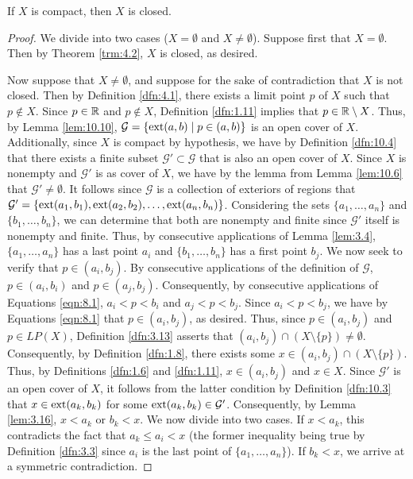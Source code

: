 \documentclass[../main.tex]{subfiles}
\begin{document}
\begin{theorem}\label{trm:10.11}
    If $X$ is compact, then $X$ is closed.
    \begin{proof}
        We divide into two cases ($X=\emptyset$ and $X\neq\emptyset$). Suppose first that $X=\emptyset$. Then by Theorem \ref{trm:4.2}, $X$ is closed, as desired.\par
        Now suppose that $X\neq\emptyset$, and suppose for the sake of contradiction that $X$ is not closed. Then by Definition \ref{dfn:4.1}, there exists a limit point $p$ of $X$ such that $p\notin X$. Since $p\in\mathbb{R}$ and $p\notin X$, Definition \ref{dfn:1.11} implies that $p\in\mathbb{R}\setminus X$. Thus, by Lemma \ref{lem:10.10}, $\mathcal{G}=\{\operatorname{ext}(a,b)\mid p\in(a,b)\}$ is an open cover of $X$. Additionally, since $X$ is compact by hypothesis, we have by Definition \ref{dfn:10.4} that there exists a finite subset $\mathcal{G}'\subset\mathcal{G}$ that is also an open cover of $X$. Since $X$ is nonempty and $\mathcal{G}'$ is as cover of $X$, we have by the lemma from Lemma \ref{lem:10.6} that $\mathcal{G}'\neq\emptyset$. It follows since $\mathcal{G}$ is a collection of exteriors of regions that $\mathcal{G}'=\{\operatorname{ext}(a_1,b_1),\operatorname{ext}(a_2,b_2),\dots,\operatorname{ext}(a_n,b_n)\}$. Considering the sets $\{a_1,\dots,a_n\}$ and $\{b_1,\dots,b_n\}$, we can determine that both are nonempty and finite since $\mathcal{G}'$ itself is nonempty and finite. Thus, by consecutive applications of Lemma \ref{lem:3.4}, $\{a_1,\dots,a_n\}$ has a last point $a_i$ and $\{b_1,\dots,b_n\}$ has a first point $b_j$. We now seek to verify that $p\in(a_i,b_j)$. By consecutive applications of the definition of $\mathcal{G}$, $p\in(a_i,b_i)$ and $p\in(a_j,b_j)$. Consequently, by consecutive applications of Equations \ref{eqn:8.1}, $a_i<p<b_i$ and $a_j<p<b_j$. Since $a_i<p<b_j$, we have by Equations \ref{eqn:8.1} that $p\in(a_i,b_j)$, as desired. Thus, since $p\in(a_i,b_j)$ and $p\in LP(X)$, Definition \ref{dfn:3.13} asserts that $(a_i,b_j)\cap(X\setminus\{p\})\neq\emptyset$. Consequently, by Definition \ref{dfn:1.8}, there exists some $x\in(a_i,b_j)\cap(X\setminus\{p\})$. Thus, by Definitions \ref{dfn:1.6} and \ref{dfn:1.11}, $x\in(a_i,b_j)$ and $x\in X$. Since $\mathcal{G}'$ is an open cover of $X$, it follows from the latter condition by Definition \ref{dfn:10.3} that $x\in\operatorname{ext}(a_k,b_k)$ for some $\operatorname{ext}(a_k,b_k)\in\mathcal{G}'$. Consequently, by Lemma \ref{lem:3.16}, $x<a_k$ or $b_k<x$. We now divide into two cases. If $x<a_k$, this contradicts the fact that $a_k\leq a_i<x$ (the former inequality being true by Definition \ref{dfn:3.3} since $a_i$ is the last point of $\{a_1,\dots,a_n\}$). If $b_k<x$, we arrive at a symmetric contradiction.
    \end{proof}
\end{theorem}
\end{document}

